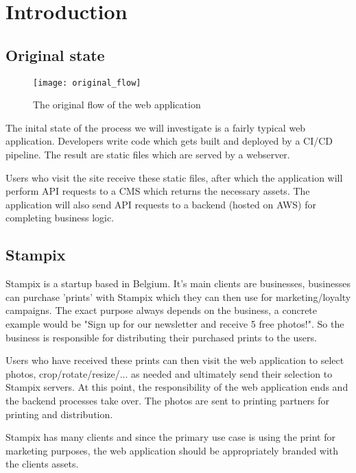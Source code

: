 
\chapter{Introduction} %

\label{Chapter1} 


\section{Original state}

\begin{figure}[h!]
	\texttt{[image: original\_flow]}
	\caption{The original flow of the web application}
	\label{fig:original_flow}
\end{figure}


The inital state of the process we will investigate is a fairly typical web application. Developers write code which gets built and deployed by a CI/CD pipeline. The result are static files which are served by a webserver.

Users who visit the site receive these static files, after which the application will perform API requests to a CMS which returns the necessary assets. The application will also send API requests to a backend (hosted on AWS) for completing business logic.


\section{Stampix}

Stampix is a startup based in Belgium. It's main clients are businesses, businesses can purchase 'prints' with Stampix which they can then use for marketing/loyalty campaigns. 
The exact purpose always depends on the business, a concrete example would be "Sign up for our newsletter and receive 5 free photos!". So the business is responsible for distributing their purchased prints to the users.

Users who have received these prints can then visit the web application to select photos, crop/rotate/resize/... as needed and ultimately send their selection to Stampix servers. 
At this point, the responsibility of the web application ends and the backend processes take over. The photos are sent to printing partners for printing and distribution.

Stampix has many clients and since the primary use case is using the print for marketing purposes, the web application should be appropriately branded with the clients assets.
